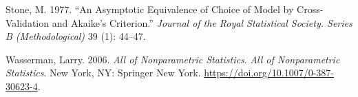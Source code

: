 \documentclass[
  12pt,
]{book}
\newlength{\cslhangindent}
\newlength{\cslentryspacingunit} %
\newenvironment{CSLReferences}[2] %
 {%
  \setlength{\parindent}{0pt}
  \ifodd #1
  \let\oldpar\par
  \def\par{\hangindent=\cslhangindent\oldpar}
  \fi
  \setlength{\parskip}{#2\cslentryspacingunit}
 }%
 {}
\begin{document}
\begin{CSLReferences}{1}{0}
\leavevmode{}%
Stone, M. 1977. {``An {Asymptotic Equivalence} of {Choice} of {Model} by
{Cross}-{Validation} and {Akaike}'s {Criterion}.''} \emph{Journal of the
Royal Statistical Society. Series B (Methodological)} 39 (1): 44--47.

\leavevmode{}%
Wasserman, Larry. 2006. \emph{All of {Nonparametric Statistics}}.
\emph{All of Nonparametric Statistics}. {New York, NY}: {Springer New
York}. \url{https://doi.org/10.1007/0-387-30623-4}.

\end{CSLReferences}

\backmatter
\end{document}
